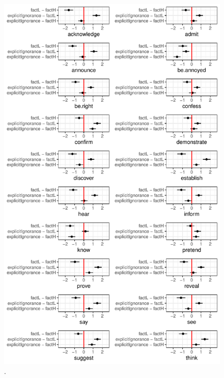 \documentclass[11pt,fleqn]{article}
\newcommand{\6}{\mbox{$[\hspace*{-.6mm}[$}}
\newcommand{\9}{\mbox{$]\hspace*{-.6mm}]$}}
\begin{document}
\begin{figure}[h!]
\centering
\includegraphics[width=.8\textwidth]{../../results/main/13explicitIgnorance/graphs/context-comparisons}
\caption{.}\label{fig:comparisons2}
\end{figure}
 
\end{document}
